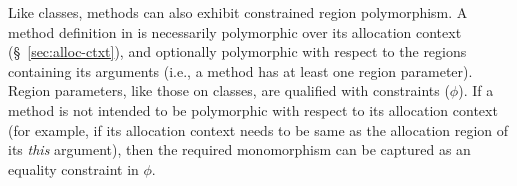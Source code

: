 
Like classes, methods can also exhibit constrained region
polymorphism.  A method definition in \FB is necessarily polymorphic
over its allocation context (\S~\ref{sec:alloc-ctxt}), and optionally
polymorphic with respect to the regions containing its arguments
(i.e., a method has at least one region parameter). Region
parameters, like those on classes, are qualified with constraints
($\phi$).
If a method is not intended to be polymorphic with respect to its
allocation context (for example, if its allocation context needs to be
same as the allocation region of its \emph{this} argument), then the
required monomorphism can be captured as an equality constraint in
$\phi$.  

